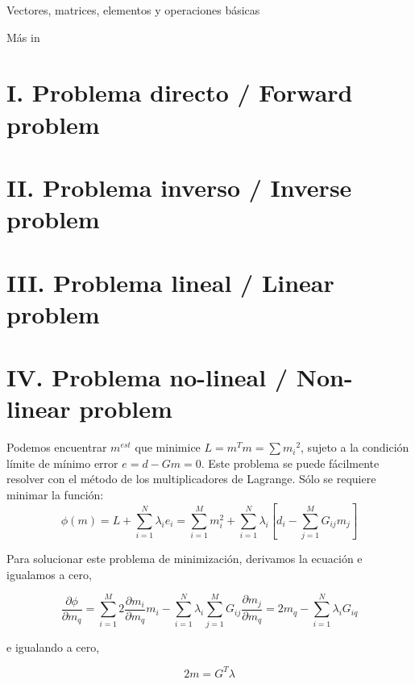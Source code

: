 \documentclass[aspectratio=169]{beamer}
\begin{document}
\begin{frame}
 {Vectores, matrices, elementos y operaciones b\'asicas}

 \begin{center}
  \Large M\'as in \cite{Menke_2018_GEO}
 \end{center}
 
\end{frame}




\section{\small I. Problema directo / Forward problem}

\section{\small II. Problema inverso / Inverse problem}

\section{\small III. Problema lineal / Linear problem}

\section{\small IV. Problema no-lineal / Non-linear problem}

\begin{frame}
 
{\color{black}Podemos encuentrar $m^{est}$ que minimice $L=m^Tm=\sum{m_i}^2$, sujeto a la condición límite de mínimo error $e = d - Gm = 0$. Este problema se puede fácilmente resolver con el método de los multiplicadores de Lagrange. Sólo se requiere minimar la función:
 \begin{equation}
  \phi(m) = L + \sum_{i=1}^N{\lambda_i e_i} = \sum_{i=1}^M m^2_i + \sum_{i=1}^N{ \lambda_i   \left[ d_i - \sum^M_{j=1} G_{ij}m_j\right]
}
\end{equation}


Para solucionar este problema de minimización, derivamos la ecuación e igualamos a cero,

\begin{equation}
 \frac{\partial\phi}{\partial m_q} = 
 \sum_{i=1}^M 2 \frac{\partial m_i}{\partial m_q} m_i - \sum_{i=1}^N \lambda_i 
 \sum_{j=1}^M {G_{ij} \frac{\partial m_j}{\partial m_q}} = 2m_q - \sum_{i=1}^N{\lambda_i G_{iq}}
\end{equation}

e igualando a cero,

\begin{equation}
 2m =  G^T \lambda
\end{equation}
}
 
\end{frame}
\end{document}
